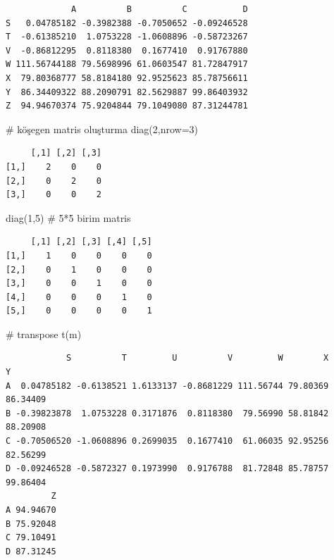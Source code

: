 \documentclass[
  letterpaper,
  DIV=11,
  numbers=noendperiod]{scrreprt}
\newenvironment{Shaded}{\begin{snugshade}}{\end{snugshade}}
\newcommand{\AttributeTok}[1]{\textcolor[rgb]{0.40,0.45,0.13}{#1}}
\newcommand{\CommentTok}[1]{\textcolor[rgb]{0.37,0.37,0.37}{#1}}
\newcommand{\DecValTok}[1]{\textcolor[rgb]{0.68,0.00,0.00}{#1}}
\newcommand{\FunctionTok}[1]{\textcolor[rgb]{0.28,0.35,0.67}{#1}}
\newcommand{\NormalTok}[1]{\textcolor[rgb]{0.00,0.23,0.31}{#1}}
\begin{document}
\begin{verbatim}
             A          B          C           D
S   0.04785182 -0.3982388 -0.7050652 -0.09246528
T  -0.61385210  1.0753228 -1.0608896 -0.58723267
V  -0.86812295  0.8118380  0.1677410  0.91767880
W 111.56744188 79.5698996 61.0603547 81.72847917
X  79.80368777 58.8184180 92.9525623 85.78756611
Y  86.34409322 88.2090791 82.5629887 99.86403932
Z  94.94670374 75.9204844 79.1049080 87.31244781
\end{verbatim}

\begin{Shaded}
\begin{Highlighting}[]
\CommentTok{\# köşegen matris oluşturma}
\FunctionTok{diag}\NormalTok{(}\DecValTok{2}\NormalTok{,}\AttributeTok{nrow=}\DecValTok{3}\NormalTok{)}
\end{Highlighting}
\end{Shaded}

\begin{verbatim}
     [,1] [,2] [,3]
[1,]    2    0    0
[2,]    0    2    0
[3,]    0    0    2
\end{verbatim}

\begin{Shaded}
\begin{Highlighting}[]
\FunctionTok{diag}\NormalTok{(}\DecValTok{1}\NormalTok{,}\DecValTok{5}\NormalTok{) }\CommentTok{\# 5*5 birim matris}
\end{Highlighting}
\end{Shaded}

\begin{verbatim}
     [,1] [,2] [,3] [,4] [,5]
[1,]    1    0    0    0    0
[2,]    0    1    0    0    0
[3,]    0    0    1    0    0
[4,]    0    0    0    1    0
[5,]    0    0    0    0    1
\end{verbatim}

\begin{Shaded}
\begin{Highlighting}[]
\CommentTok{\# transpose}
\FunctionTok{t}\NormalTok{(m)}
\end{Highlighting}
\end{Shaded}

\begin{verbatim}
            S          T         U          V         W        X        Y
A  0.04785182 -0.6138521 1.6133137 -0.8681229 111.56744 79.80369 86.34409
B -0.39823878  1.0753228 0.3171876  0.8118380  79.56990 58.81842 88.20908
C -0.70506520 -1.0608896 0.2699035  0.1677410  61.06035 92.95256 82.56299
D -0.09246528 -0.5872327 0.1973990  0.9176788  81.72848 85.78757 99.86404
         Z
A 94.94670
B 75.92048
C 79.10491
D 87.31245
\end{verbatim}
\end{document}
